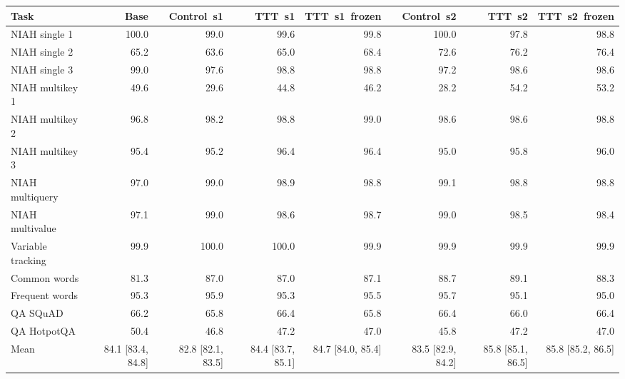 \begin{tabular}{lrrrrrrr}
\toprule
Task & Base & Control~s1 & TTT~s1 & TTT~s1~frozen & Control~s2 & TTT~s2 & TTT~s2~frozen \\
\midrule
NIAH single 1 & 100.0 & 99.0 & 99.6 & 99.8 & 100.0 & 97.8 & 98.8 \\
NIAH single 2 & 65.2 & 63.6 & 65.0 & 68.4 & 72.6 & 76.2 & 76.4 \\
NIAH single 3 & 99.0 & 97.6 & 98.8 & 98.8 & 97.2 & 98.6 & 98.6 \\
NIAH multikey 1 & 49.6 & 29.6 & 44.8 & 46.2 & 28.2 & 54.2 & 53.2 \\
NIAH multikey 2 & 96.8 & 98.2 & 98.8 & 99.0 & 98.6 & 98.6 & 98.8 \\
NIAH multikey 3 & 95.4 & 95.2 & 96.4 & 96.4 & 95.0 & 95.8 & 96.0 \\
NIAH multiquery & 97.0 & 99.0 & 98.9 & 98.8 & 99.1 & 98.8 & 98.8 \\
NIAH multivalue & 97.1 & 99.0 & 98.6 & 98.7 & 99.0 & 98.5 & 98.4 \\
Variable tracking & 99.9 & 100.0 & 100.0 & 99.9 & 99.9 & 99.9 & 99.9 \\
Common words & 81.3 & 87.0 & 87.0 & 87.1 & 88.7 & 89.1 & 88.3 \\
Frequent words & 95.3 & 95.9 & 95.3 & 95.5 & 95.7 & 95.1 & 95.0 \\
QA SQuAD & 66.2 & 65.8 & 66.4 & 65.8 & 66.4 & 66.0 & 66.4 \\
QA HotpotQA & 50.4 & 46.8 & 47.2 & 47.0 & 45.8 & 47.2 & 47.0 \\
\midrule
Mean & 84.1 [83.4, 84.8] & 82.8 [82.1, 83.5] & 84.4 [83.7, 85.1] & 84.7 [84.0, 85.4] & 83.5 [82.9, 84.2] & 85.8 [85.1, 86.5] & 85.8 [85.2, 86.5] \\
\bottomrule
\end{tabular}
